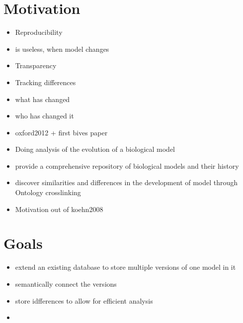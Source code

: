 \section{Motivation}

\begin{itemize}
\item Reproducibility
	\item \sedml is useless, when model changes
\item Transparency
\item Tracking differences
	\item what has changed
	\item who has changed it
	\item oxford2012 + first bives paper
	
\item Doing analysis of the evolution of a biological model
\item provide a comprehensive repository of biological models and their history
\item discover similarities and differences in the development of model through Ontology crosslinking
\item Motivation out of koehn2008 \cite{Kohn2008}
\end{itemize}

\section{Goals}
\begin{itemize}
	\item extend an existing database to store multiple versions of one model in it
\item semantically connect the versions
\item store idfferences to allow for efficient analysis
\item {}
\end{itemize}
